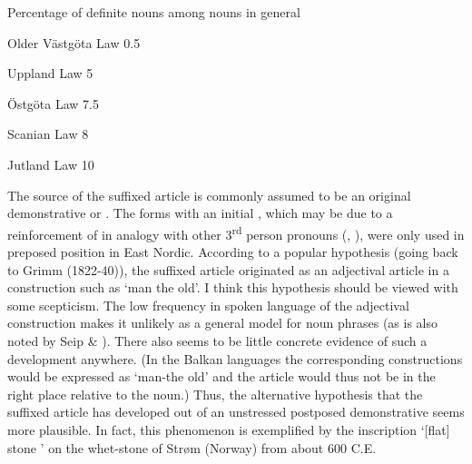 
\begin{table}
\caption{ Percentage of definite nouns among nouns in general}
\label{tab:1}
\end{table}

Older Västgöta Law  0.5

Uppland Law  5

Östgöta Law  7.5

Scanian Law  8

Jutland Law  10

The source of the suffixed article is commonly assumed to be an original demonstrative  or . The forms with an initial , which may be due to a reinforcement of  in analogy with other 3\textsuperscript{rd} person pronouns (\citet[135]{Perridon1989}, \citet[723]{Syrett2002}), were only used in preposed position in East Nordic. According to a popular hypothesis (going back to Grimm (1822-40)), the suffixed article originated as an adjectival article in a construction such as ‘man the old’. I think this hypothesis should be viewed with some scepticism. The low frequency in spoken language of the adjectival construction makes it unlikely as a general model for noun phrases (as is also noted by Seip \& \citet[63]{Saltveit1971}). There also seems to be little concrete evidence of such a development anywhere. (In the Balkan languages the corresponding constructions would be expressed as ‘man-the old’ and the article would thus not be in the right place relative to the noun.)  Thus, the alternative hypothesis that the suffixed article has developed out of an unstressed postposed demonstrative seems more plausible.  In fact, this phenomenon is exemplified by the inscription  ‘[flat] stone ’ on the whet-stone of Strøm (Norway) from about 600 C.E. 


